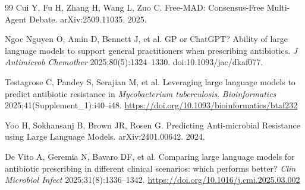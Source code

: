 \documentclass[11pt,letterpaper]{article}
\begin{document}
\begin{thebibliography}{99}
Cui Y, Fu H, Zhang H, Wang L, Zuo C.
Free-MAD: Consensus-Free Multi-Agent Debate.
arXiv:2509.11035. 2025.

Ngoc Nguyen O, Amin D, Bennett J, et al.
GP or ChatGPT? Ability of large language models to support general practitioners when prescribing antibiotics.
\textit{J Antimicrob Chemother} 2025;80(5):1324--1330.
doi:10.1093/jac/dkaf077.

Testagrose C, Pandey S, Serajian M, et al.
Leveraging large language models to predict antibiotic resistance in \textit{Mycobacterium tuberculosis}.
\textit{Bioinformatics} 2025;41(Supplement\_1):i40--i48.
\url{https://doi.org/10.1093/bioinformatics/btaf232}

Yoo H, Sokhansanj B, Brown JR, Rosen G.
Predicting Anti-microbial Resistance using Large Language Models.
arXiv:2401.00642. 2024.

De Vito A, Geremia N, Bavaro DF, et al.
Comparing large language models for antibiotic prescribing in different clinical scenarios: which performs better?
\textit{Clin Microbiol Infect} 2025;31(8):1336--1342.
\url{https://doi.org/10.1016/j.cmi.2025.03.002}

\end{thebibliography}
\end{document}
